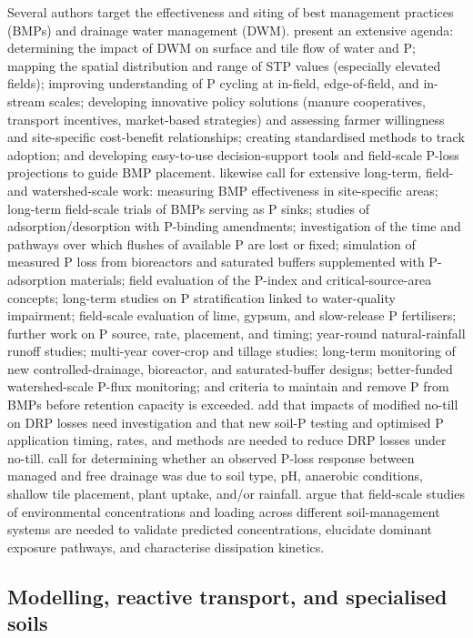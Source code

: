 Several authors target the effectiveness and siting of best management practices (BMPs) and drainage water management (DWM). \textcite{Wilson2019} present an extensive agenda: determining the impact of DWM on surface and tile flow of water and P; mapping the spatial distribution and range of STP values (especially elevated fields); improving understanding of P cycling at in-field, edge-of-field, and in-stream scales; developing innovative policy solutions (manure cooperatives, transport incentives, market-based strategies) and assessing farmer willingness and site-specific cost-benefit relationships; creating standardised methods to track adoption; and developing easy-to-use decision-support tools and field-scale P-loss projections to guide BMP placement. \textcite{Singh2020c} likewise call for extensive long-term, field- and watershed-scale work: measuring BMP effectiveness in site-specific areas; long-term field-scale trials of BMPs serving as P sinks; studies of adsorption/desorption with P-binding amendments; investigation of the time and pathways over which flushes of available P are lost or fixed; simulation of measured P loss from bioreactors and saturated buffers supplemented with P-adsorption materials; field evaluation of the P-index and critical-source-area concepts; long-term studies on P stratification linked to water-quality impairment; field-scale evaluation of lime, gypsum, and slow-release P fertilisers; further work on P source, rate, placement, and timing; year-round natural-rainfall runoff studies; multi-year cover-crop and tillage studies; long-term monitoring of new controlled-drainage, bioreactor, and saturated-buffer designs; better-funded watershed-scale P-flux monitoring; and criteria to maintain and remove P from BMPs before retention capacity is exceeded. \textcite{Zhang2017} add that impacts of modified no-till on DRP losses need investigation and that new soil-P testing and optimised P application timing, rates, and methods are needed to reduce DRP losses under no-till. \textcite{Nash2015c} call for determining whether an observed P-loss response between managed and free drainage was due to soil type, pH, anaerobic conditions, shallow tile placement, plant uptake, and/or rainfall. \textcite{Gottschall2012} argue that field-scale studies of environmental concentrations and loading across different soil-management systems are needed to validate predicted concentrations, elucidate dominant exposure pathways, and characterise dissipation kinetics.

\subsection{Modelling, reactive transport, and specialised soils}

